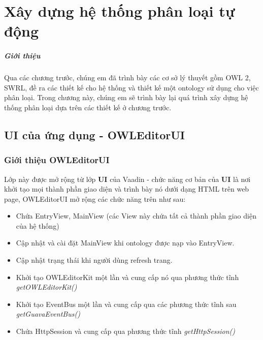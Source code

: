 \chapter{Xây dựng hệ thống phân loại tự động}
\paragraph{Giới thiệu} Qua các chương trước, chúng em đã trình bày các cơ sở lý thuyết gồm OWL 2, SWRL, đề ra các thiết kế cho hệ thống và thiết kế một ontology sử dụng cho việc phân loại. Trong chương này, chúng em sẽ trình bày lại quá trình xây dựng hệ thống phân loại dựa trên các thiết kế ở chương trước.
\section{UI của ứng dụng - OWLEditorUI}
\subsection{Giới thiệu OWLEditorUI}
Lớp này được mở rộng từ lớp \textbf{UI} của Vaadin - chức năng cơ bản của \textbf{UI} là nơi khởi tạo mọi thành phần giao diện và trình bày nó dưới dạng HTML trên web page, OWLEditorUI mở rộng các chức năng trên như sau:
\begin{itemize}
\item Chứa EntryView, MainView (các View này chứa tất cả thành phần giao diện của hệ thống)
\item Cập nhật và cài đặt MainView khi ontology được nạp vào EntryView.
\item Cập nhật trạng thái khi người dùng refresh trang.
\item Khởi tạo OWLEditorKit một lần và cung cấp nó qua phương thức tĩnh \textit{getOWLEditorKit()} 
\item Khới tạo EventBus một lần và cung cấp qua các phương thức tĩnh sau \textit{getGuavaEventBus()}
\item Chứa HttpSession và cung cấp qua phương thức tĩnh \textit{getHttpSession()} 
\end{itemize}
